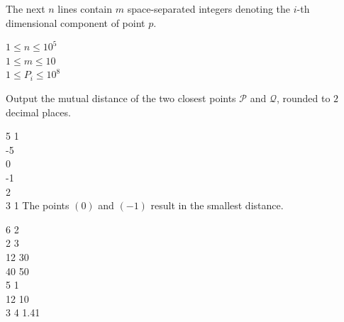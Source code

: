 \documentclass{contest-set}
\begin{document}
The next $n$ lines contain $m$ space-separated integers denoting the $i$-th dimensional component of point $p$.

\constraints
$1 \leq n \leq 10^5$\\
$1 \leq m \leq 10$\\
$1 \leq P_i \leq 10^8$

\pushnewpage

\outputformat
Output the mutual distance of the two closest points $\mathcal{P}$ and $\mathcal{Q}$, rounded to $2$ decimal places.

\addsampleExplanation
{
5 1\\
-5\\
0\\
-1\\
2\\
3
}
{
1
}
{
The points $(0)$ and $(-1)$ result in the smallest distance.
}

\addsample
{
6 2\\
2 3\\
12 30\\
40 50\\
5 1\\
12 10\\
3 4
}
{
1.41
}
\end{document}
